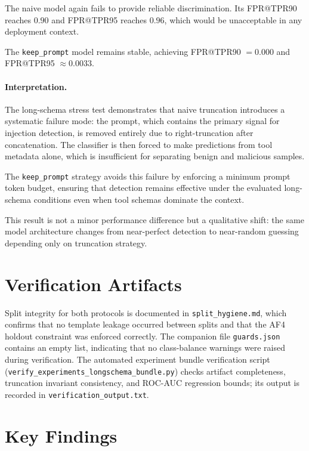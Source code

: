 The naive model again fails to provide reliable discrimination. Its FPR@TPR90 reaches $0.90$ and FPR@TPR95 reaches $0.96$, which would be unacceptable in any deployment context.

The \texttt{keep\_prompt} model remains stable, achieving FPR@TPR90 $=0.000$ and FPR@TPR95 $\approx 0.0033$.

\paragraph{Interpretation.}
The long-schema stress test demonstrates that naive truncation introduces a systematic failure mode: the prompt, which contains the primary signal for injection detection, is removed entirely due to right-truncation after concatenation. The classifier is then forced to make predictions from tool metadata alone, which is insufficient for separating benign and malicious samples.

The \texttt{keep\_prompt} strategy avoids this failure by enforcing a minimum prompt token budget, ensuring that detection remains effective under the evaluated long-schema conditions even when tool schemas dominate the context.

This result is not a minor performance difference but a qualitative shift: the same model architecture changes from near-perfect detection to near-random guessing depending only on truncation strategy.

\section{Verification Artifacts}
\label{subsec:verification_artifacts}

Split integrity for both protocols is documented in \texttt{split\_hygiene.md}, which confirms that no template leakage occurred between splits and that the AF4 holdout constraint was enforced correctly. The companion file \texttt{guards.json} contains an empty list, indicating that no class-balance warnings were raised during verification. The automated experiment bundle verification script (\texttt{verify\_experiments\_longschema\_bundle.py}) checks artifact completeness, truncation invariant consistency, and ROC-AUC regression bounds; its output is recorded in \texttt{verification\_output.txt}.

\section{Key Findings}
\label{subsec:key_findings}

